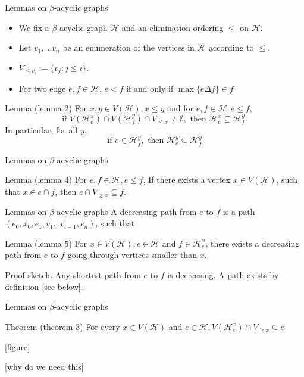 \begin{frame}[t]{Lemmas on $\beta$-acyclic graphs}
	\begin{itemize}
		\item We fix a $\beta$-acyclic graph $\mathcal{H}$ and an elimination-ordering $\leq$ on $\mathcal{H}$.
		\item Let $v_1, \dots v_n$ be an enumeration of the vertices in $\mathcal{H}$ according to $\leq$.
		\item $V_{\leq v_i} := \{v_j ; j\leq i\}$.
		\item For two edge $e, f \in \mathcal{H}$, $e < f$ if and only if $\max\{e \Delta f\}\in f$
	\end{itemize}
	\begin{block}{Lemma (lemma 2)}
		For $x,y \in V(\mathcal{H}), x \leq y$ and for $e, f \in \mathcal{H}, e \leq f$,
			$$\text{if } V(\mathcal{H}^x_e)\cap V(\mathcal{H}^y_f)\cap V_{\leq x} \neq \emptyset,
			\text{ then } \mathcal{H}^x_e \subseteq \mathcal{H}^y_f.$$
		In particular, for all $y$,
		$$\text{if } e \in \mathcal{H}^y_f, \text{ then } \mathcal{H}^y_e \subseteq \mathcal{H}^y_f$$
	\end{block}
\end{frame}

\begin{frame}[t]{Lemmas on $\beta$-acyclic graphs}
	\begin{block}{Lemma (lemma 4)}
		For $e, f \in \mathcal{H}, e\leq f$, If there exists a vertex $x \in V(\mathcal{H})$, such that $x \in e \cap f$, then $e \cap V_{\geq x} \subseteq f$.
	\end{block}
\end{frame}

\begin{frame}[t]{Lemmas on $\beta$-acyclic graphs}
	A decreasing path from $e$ to $f$ is a path $(e_0, x_0, e_1, v_1 \dots v_{l-1}, e_n)$, such that 
	\begin{block}{Lemma (lemma 5)}
		For $x \in V(\mathcal{H}), e \in \mathcal{H}$ and $f \in \mathcal{H}^x_e$, there exists a decreasing path from $e$ to $f$ going through vertices smaller than $x$.
	\end{block}
	Proof sketch. Any shortest path from $e$ to $f$ is decreasing. A path exists by definition [see below].

\end{frame}

\begin{frame}[t]{Lemmas on $\beta$-acyclic graphs}
	\begin{block}{Theorem (theorem 3)}
		For every $x \in V(\mathcal{H})$ and $e \in \mathcal{H}, V(\mathcal{H}^x_e) \cap V_{\geq x} \subseteq e$
	\end{block}

	[figure]

	[why do we need this]
\end{frame}


